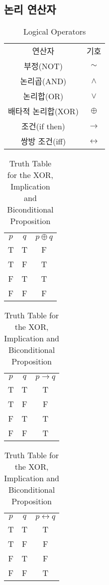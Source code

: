 \subsection{논리 연산자}
\begin{table}[]
    \begin{minipage}{\linewidth}
        \caption {Logical Operators}
        \centering
        \begin{tabular}{c|c}
        연산자      & 기호\\
        \Xhline{3\arrayrulewidth}
        부정(NOT)  & $\sim$\\
        \hline
        논리곱(AND) & $\land$\\
        \hline
        논리합(OR)  & $\lor$\\
        \hline
        배타적 논리합(XOR)&$\oplus$\\
        \hline
        조건(if then)&$\to$\\
        \hline
        쌍방 조건(iff)&$\leftrightarrow$
        \end{tabular}
    \end{minipage}
\end{table}
\begin{table}[]
    \caption {Truth Table for the XOR, Implication and Biconditional Proposition}
    \begin{minipage}{.33\linewidth}
        \centering
        \begin{tabular}{cc|c}
        $p$&$q$&$p\oplus q$\\
        \Xhline{3\arrayrulewidth}
        T&T&F\\
        T&F&T\\
        F&T&T\\
        F&F&F
        \end{tabular}
    \end{minipage}
    \begin{minipage}{.33\linewidth}
        \centering
        \begin{tabular}{cc|c}
        $p$&$q$&$p\to q$\\
        \Xhline{3\arrayrulewidth}
        T&T&T\\
        T&F&F\\
        F&T&T\\
        F&F&T
        \end{tabular}
    \end{minipage}
    \begin{minipage}{.33\linewidth}
        \centering
        \begin{tabular}{cc|c}
        $p$&$q$&$p\leftrightarrow q$\\
        \Xhline{3\arrayrulewidth}
        T&T&T\\
        T&F&F\\
        F&T&F\\
        F&F&T
        \end{tabular}
    \end{minipage}
\end{table}
